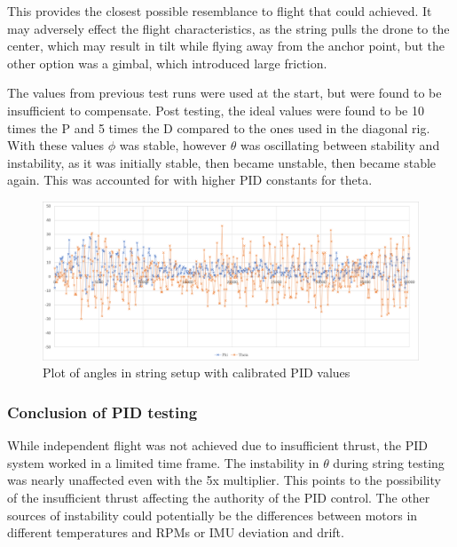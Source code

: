 This provides the closest possible resemblance to flight that could achieved. It may adversely effect the flight characteristics, as the string pulls the drone to the center, which may result in tilt while flying away from the anchor point, but the other option was a gimbal, which introduced large friction.

The values from previous test runs were used at the start, but were found to be insufficient to compensate. Post testing, the ideal values were found to be 10 times the P and 5 times the D compared to the ones used in the diagonal rig. With these values $\phi$ was stable, however $\theta$ was oscillating between stability and instability, as it was initially stable, then became unstable, then became stable again. This was accounted for with higher PID constants for theta.

\begin{figure}[h!]
    \centering
    \includegraphics[width=\textwidth]{pictures/graphs/ZN10P5DT4The5.png}
    \caption{Plot of angles in string setup with calibrated PID values}
    \label{fig:ZN10P}
\end{figure}

\subsubsection{Conclusion of PID testing}

While independent flight was not achieved due to insufficient thrust, the PID system worked in a limited time frame. The instability in $\theta$ during string testing was nearly unaffected even with the 5x multiplier. This points to the possibility of the insufficient thrust affecting the authority of the PID control.
The other sources of instability could potentially be the differences between motors in different temperatures and RPMs or IMU deviation and drift.
